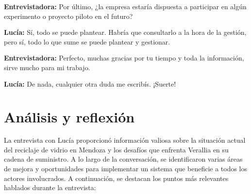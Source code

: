 \textbf{Entrevistadora:} Por último, ¿la empresa estaría dispuesta a participar en algún experimento o proyecto piloto en el futuro?

\textbf{Lucía:} Sí, todo se puede plantear. Habría que consultarlo a la hora de la gestión, pero sí, todo lo que sume se puede plantear y gestionar.

\textbf{Entrevistadora:} Perfecto, muchas gracias por tu tiempo y toda la información, sirve mucho para mi trabajo.

\textbf{Lucía:} De nada, cualquier otra duda me escribís. ¡Suerte!

\section{Análisis y reflexión}

La entrevista con Lucía proporcionó información valiosa sobre la situación actual del reciclaje de vidrio en Mendoza y los desafíos que enfrenta Verallia en su cadena de suministro. A lo largo de la conversación, se identificaron varias áreas de mejora y oportunidades para implementar un sistema que beneficie a todos los actores involucrados. A continuación, se destacan los puntos más relevantes hablados durante la entrevista:

